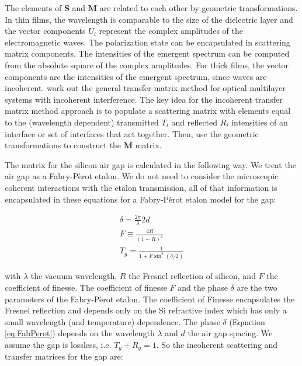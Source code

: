 The elements of $\boldsymbol{S}$ and $\boldsymbol{M}$ are related to each other by geometric transformations\cite{2007fuph.book.....S}.  In thin films, the wavelength is comparable to the size of the dielectric layer and the vector components $U_{i}$ represent the complex amplitudes of the electromagnetic waves.  The polarization state can be encapsulated in scattering matrix components\cite{2007fuph.book.....S}.  The intensities of the emergent spectrum can be computed from the absolute square of the complex amplitudes.  For thick films, the vector components are the intensities of the emergent spectrum, since waves are incoherent.  \cite{2002ApOpt..41.3978K} work out the general transfer-matrix method for optical multilayer systems with incoherent interference.  The key idea for the incoherent transfer matrix method approach is to populate a scattering matrix with elements equal to the (wavelength dependent) transmitted $T_i$ and reflected $R_i$ intensities of an interface or set of interfaces that act together.  Then, use the geometric transformations to construct the $\boldsymbol{M}$ matrix.

The matrix for the silicon air gap is calculated in the following way.  We treat the air gap as a Fabry-P\`erot etalon.  We do not need to consider the microscopic coherent interactions with the etalon transmission, all of that information is encapsulated in these equations for a Fabry-P\`erot etalon model for the gap:

\begin{eqnarray}
 \delta = \frac{2\pi}{\lambda}2d \\
  F \equiv \frac{4R}{(1-R)^2} \\
 T_g = \frac{1}{1+F\sin^2(\delta/2)}  \label{eq:FabPerot}
\end{eqnarray}

with $\lambda$ the vacuum wavelength, $R$ the Fresnel reflection of silicon, and $F$ the coefficient of finesse.  The coefficient of finesse $F$ and the phase $\delta$ are the two parameters of the Fabry-P\`erot etalon.  The coefficient of Finesse encapsulates the Fresnel reflection and depends only on the Si refractive index which has only a small wavelength (and temperature) dependence.  The phase $\delta$ (Equation \ref{eq:FabPerot}) depends on the wavelength $\lambda$ and $d$ the air gap spacing.  We assume the gap is lossless, i.e. $T_g+R_g=1$.  So the incoherent scattering and transfer matrices for the gap are:

